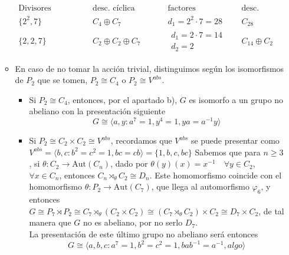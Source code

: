 \documentclass[12pt]{article}
\newcommand{\Aut}{\text{Aut}}
\begin{document}
\begin{ejercicio}
\begin{enumerate}[label=(\alph*)]
\begin{itemize}
                \begin{equation*}
                    \begin{array}{c|c|c|c}
                        \text{Divisores elementales} & \text{desc. cíclica primaria} & \text{factores invariantes} & \text{desc. cíclica} \\
                        \hline
                        \{2^2, 7\} & C_4 \oplus C_{7} & d_1 = 2^2\cdot 7 = 28 & C_{28} \\
                        \hline
                        \{2, 2, 7\} & C_2\oplus C_2\oplus C_7 & \begin{array}{c}
                                d_1 = 2 \cdot 7 = 14 \\
                                d_2 = 2
                        \end{array}& C_{14}\oplus C_2
                    \end{array}
                \end{equation*}
                \item En caso de no tomar la acción trivial, distinguimos según los isomorfismos de $P_2$ que se tomen, $P_2 \cong C_4$ o $P_2 \cong V^{abs}$.
                \begin{itemize}
                    \item Si $P_2 \cong C_4$, entonces, por el apartado b), $G$ es isomorfo a un grupo no abeliano con la presentación siguiente $$G \cong \langle a,y : a^7 = 1,  y^4 = 1, ya = a^{-1}y \rangle$$
                    \item Si $P_2 \cong C_2 \times C_2 \cong V^{abs}$, recordamos que $V^{abs}$ se puede presentar como $V^{abs} = \langle b,c : b^2 = c^2 = 1, bc = cb \rangle = \{1, b, c, bc\}$
                    Sabemos que para $n \geqslant 3$, si $\theta : C_2 \to \Aut(C_n)$, dado por $\theta(y)(x) = x^{-1} \quad \forall y \in C_2$, $\forall x \in C_n$, entonces $C_n \rtimes_{\theta} C_2 \cong D_n$.
                    Este homomorfismo coincide con el homomorfismo $\theta: P_2 \to \Aut(C_7)$, que llega al automorfismo $\varphi_6$, y entonces $G \cong P_7 \rtimes P_2 \cong C_7 \rtimes_{\theta} (C_2 \times C_2) \cong (C_7 \rtimes_{\theta} C_2) \times C_2 \cong 
                    D_7 \times C_2$, de tal manera que $G$ no es abeliano, por no serlo $D_7$. \\

                    La presentación de este último grupo no abeliano será entonces $$G \cong \langle a,b,c : a^7 = 1, b^2 = c^2 = 1, bab^{-1} = a^{-1}, algo \rangle$$


\end{itemize}
\end{itemize}
\end{enumerate}
\end{ejercicio}
\end{document}
